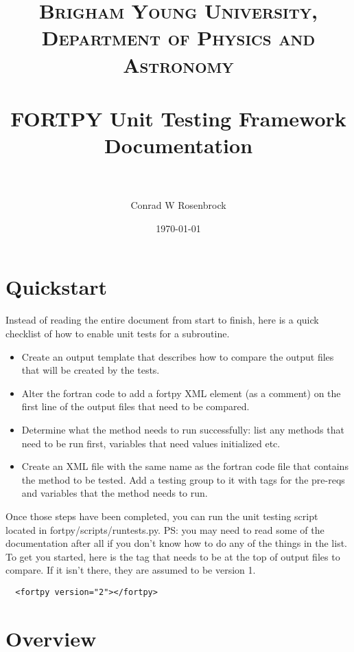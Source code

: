 \documentclass[paper=a4, fontsize=11pt]{scrartcl} %
\title{	
\normalfont \normalsize 
\textsc{Brigham Young University, Department of Physics and Astronomy} \\ [25pt] %
\horrule{0.5pt} \\[0.4cm] %
\huge FORTPY Unit Testing Framework Documentation \\ %
\horrule{2pt} \\[0.5cm] %
}
\author{Conrad W Rosenbrock} %
\date{\normalsize\today} %
\numberwithin{equation}{section} %
\numberwithin{figure}{section} %
\numberwithin{table}{section} %
\begin{document}
\maketitle %


\section{Quickstart}

Instead of reading the entire document from start to finish, here is a quick checklist
of how to enable unit tests for a subroutine.

\begin{itemize}
\item Create an output template that describes how to compare the output files that will
be created by the tests.
\item Alter the fortran code to add a fortpy XML element (as a comment) on the first line 
of the output files that need to be compared.
\item Determine what the method needs to run successfully: list any methods that need
to be run first, variables that need values initialized etc.
\item Create an XML file with the same name as the fortran code file that contains the
method to be tested. Add a testing group to it with tags for the pre-reqs and variables
that the method needs to run.
\end{itemize}

Once those steps have been completed, you can run the unit testing script located in
fortpy/scripts/runtests.py. PS: you may need to read some of the documentation after
all if you don't know how to do any of the things in the list. To get you started,
here is the tag that needs to be at the top of output files to compare. If it isn't
there, they are assumed to be version 1.

\lstset{language=XML}
\begin{lstlisting}
  <fortpy version="2"></fortpy>
\end{lstlisting}

\section{Overview}
\end{document}
